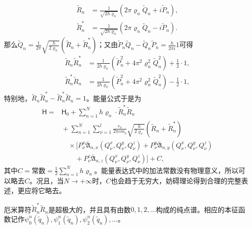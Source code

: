 \documentclass[fontsize=13pt,twoside,openany,headings=normal,parskip=false,bookmarkpackage=false,DIV=calc]{scrbook}
\begin{document}
\begin{align*}
 \widetilde R_n&=\frac1{\sqrt{2h\varrho_n}}(2\pi\varrho_n\widetilde Q_n+i\widetilde P_n),\\
 \widetilde R_n^*&=\frac1{\sqrt{2h\varrho_n}}(2\pi\varrho_n\widetilde Q_n-i\widetilde P_n).
\end{align*}
那么$\widetilde Q_n=\frac1{2\pi}\sqrt{\frac{h}{2\varrho_n}}(\widetilde R_n+\widetilde R_n^*)$；又由$\widetilde P_n\widetilde Q_n-\widetilde Q_n\widetilde P_n=\frac{h}{2\pi i}1$可得
\begin{align*}
 \widetilde R_n\widetilde R_n^*
 &=\frac1{2h\varrho_n}(\widetilde P_n^2+4\pi^2\varrho_n^2\widetilde Q_n^2)+\tfrac12\cdot1,\\
 \widetilde R_n^*\widetilde R_n
 &=\frac1{2h\varrho_n}(\widetilde P_n^2+4\pi^2\varrho_n^2\widetilde Q_n^2)-\tfrac12\cdot1,
\end{align*}
特别地，$\widetilde R_n\widetilde R_n^*-\widetilde R_n^*\widetilde R_n=1$。能量公式于是为
\begin{align*}
 \mathsf{H}={}&\mathsf{H}_0+\sum_{n=1}^{N}h\varrho_n\cdot\widetilde R_n^*\widetilde R_n\\
 &{}+\sum_{n=1}^{N}\sum_{\nu=1}^{l}\frac{e_\nu}{2\pi cm_\nu}
 \sqrt{\frac{h}{2\varrho_\nu}}(\widetilde R_n+\widetilde R_n^*)\\
 &\quad{}\times\bigl[P_\nu^x\overline{\mathfrak A}_{n,x}(Q_\nu^x,Q_\nu^y,Q_\nu^z)
 +P_\nu^y\overline{\mathfrak A}_{n,y}(Q_\nu^x,Q_\nu^y,Q_\nu^z)\\
 &\qquad{}+P_\nu^z\overline{\mathfrak A}_{n,z}(Q_\nu^x,Q_\nu^y,Q_\nu^z)\bigr]+C,
\end{align*}
其中$C=\text{常数}=\frac12\sum_{n=1}^{N}h\varrho_n$。能量表达式中的加法常数没有物理意义，所以可以略去$C$。况且，当$N\longrightarrow+\infty$时，$C$也会趋于无穷大，妨碍理论得到合理的完整表述，更应将它略去。

\hypertarget{origpage-142}{}\label{origpage-142}厄米算符$\widetilde R_n^*\widetilde R_n$是超极大的，并且具有由数$0,\allowbreak 1,\allowbreak 2,\allowbreak \ldots$构成的纯点谱。相应的本征函数记作$\psi_0^n(\widetilde q_n),\allowbreak \psi_1^n(\widetilde q_n),\allowbreak \psi_2^n(\widetilde q_n),\allowbreak \ldots$。
\end{document}
